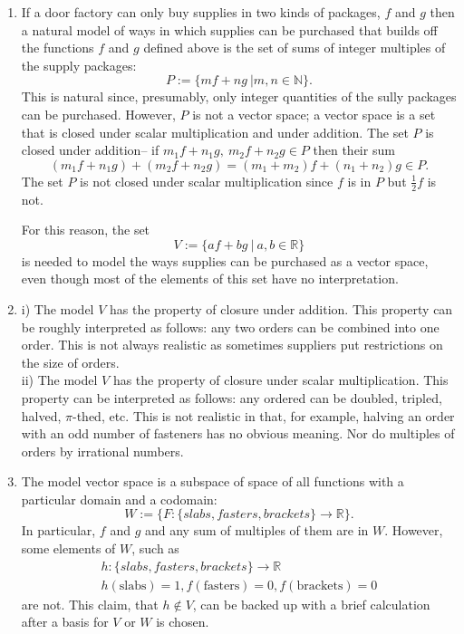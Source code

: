 \documentclass[12pt]{article}
\def\N{{\mathbb{N}}}
\def\R{{\mathbb{R}}}
\begin{document}
\begin{enumerate}
\begin{enumerate}
\item 
If a door factory can only buy supplies in two kinds of packages, $f$ and $g$ then a natural model of ways in which supplies can be purchased that builds off the functions $f$ and $g$ defined above is the set of sums of integer multiples of the supply packages:
\[P:= \{ mf+ng~\vert m,n\in \N \}. \]
This is natural since, presumably, only integer quantities of the sully packages can be purchased.
However, $P$ is not a vector space; 
a vector space is a set that is closed under scalar multiplication and under addition. 
The set $P$ is  closed under addition-- if $m_1f+n_1g,~m_2f+n_2g \in P$ then their sum  
\[
(m_1f+n_1g)+(m_2f+n_2g)=  
(m_1+m_2)f+(n_1+n_2)g  
\in P.\]
The set $P$ is not closed under scalar multiplication since $f$ is in $P$ but $\frac12 f$ is not. 

For this reason, the set 
\[V:= \{ af+bg~\vert ~a,b\in \R \}\]
is needed to model the ways supplies can be purchased as a vector space, even though most of the elements of this set have no interpretation.

\item 
i) The model $V$ has the property of closure under addition. This property can be roughly interpreted as follows: any two orders can be combined into one order. This is not always realistic as sometimes suppliers put restrictions on the size of orders. 
\\
ii) The model $V$ has the property of closure under scalar multiplication. 
This property can be interpreted as follows: any ordered can be doubled, tripled, halved, $\pi$-thed, etc. This is not realistic in that, for example, halving an order with an odd number of  fasteners has no obvious meaning. Nor do  multiples of orders by irrational numbers. 


\item 
The model vector space is a subspace of space of all functions with a particular domain and a codomain:
\[ W:=\{  F: \{ slabs, fasters,brackets \} \to \R \}.\]
In particular, 
$f$ and $g$ and any sum of multiples of them are in $W$.
However, some elements of $W$, such as 
\begin{gather*}h:\{ slabs, fasters,brackets \} \to \R \\
 h(\text{slabs})=1,f(\text{fasters})=0, f(\text{brackets})= 0\end{gather*}
are not. This claim, that $h\notin V$, can be backed up with a brief calculation after a basis for $V$ or $W$ is chosen. 


\end{enumerate}
\end{enumerate}
\end{document}
